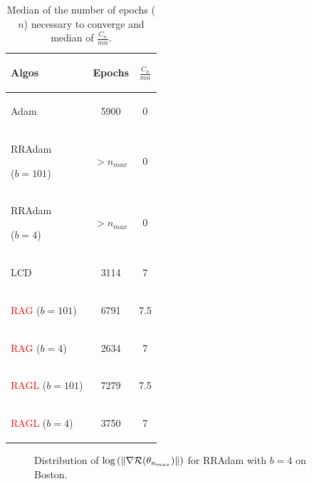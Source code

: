 \begin{table}[h!]
	\centering
	\caption{Median of the number of epochs ($n$) necessary to converge and median of $\frac{C_n}{mn}$.}
	\begin{tabular}{lcc}
		\toprule
		\begin{bf} Algos \end{bf} & \begin{bf}Epochs \end{bf} & \begin{bf}$\frac{C_n}{mn}$\end{bf} \\ \midrule
		\begin{bf}Adam\end{bf} & 5900 & 0 \\ \midrule
		\begin{bf}RRAdam\end{bf} ($b=101$) & $>n_{max}$ & 0 \\ \midrule
		\begin{bf}RRAdam\end{bf} ($b=4$) & $>n_{max}$ & 0 \\ \midrule
		\begin{bf}LCD\end{bf} & 3114 & 7 \\ \midrule
		\begin{bf}\textcolor{red}{RAG} ($b=101$) \end{bf} & 6791 & 7.5 \\ \midrule
		\begin{bf}\textcolor{red}{RAG} ($b=4$)\end{bf} & 2634 & 7  \\ \midrule
		\begin{bf}\textcolor{red}{RAGL} ($b=101$)\end{bf} & 7279 & 7.5 \\ \midrule
		\begin{bf}\textcolor{red}{RAGL} ($b=4$) \end{bf} & 3750 & 7 \\ \bottomrule
	\end{tabular}
	\label{Boston_epochs}
\end{table}

\begin{figure}[h!]
	\centering
	\scalebox{0.7}{}
	\caption{Distribution of $\log\left(\|\nabla \mathcal{R}(\theta_{n_{max}})\|\right)$ for RRAdam with $b=4$ on Boston.}
	\label{Boston_grads}
\end{figure}

